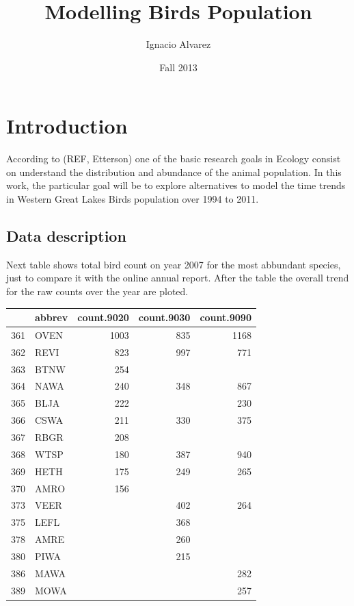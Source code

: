 \documentclass{article}\usepackage{graphicx, color}
\title{ Modelling Birds Population }
\author{Ignacio Alvarez}
\date{ Fall 2013 }
\begin{document}
\maketitle 

\section{Introduction} 
According to (REF, Etterson) one of the basic research goals in Ecology consist on understand the distribution and abundance of the animal population. In this work, the particular goal will be to explore alternatives to model the time trends in Western Great Lakes Birds population over 1994 to 2011. 

\vspace{2cm}

\subsection{Data description}

Next table shows total bird count on year 2007 for the most abbundant species, just to compare it with the online annual report. After the table the overall trend for the raw counts over the year are ploted. 

\begin{table}[ht]
\begin{center}
\begin{tabular}{rlrrr}
  \hline
 & abbrev & count.9020 & count.9030 & count.9090 \\ 
  \hline
361 & OVEN & 1003 & 835 & 1168 \\ 
  362 & REVI & 823 & 997 & 771 \\ 
  363 & BTNW & 254 &  &  \\ 
  364 & NAWA & 240 & 348 & 867 \\ 
  365 & BLJA & 222 &  & 230 \\ 
  366 & CSWA & 211 & 330 & 375 \\ 
  367 & RBGR & 208 &  &  \\ 
  368 & WTSP & 180 & 387 & 940 \\ 
  369 & HETH & 175 & 249 & 265 \\ 
  370 & AMRO & 156 &  &  \\ 
  373 & VEER &  & 402 & 264 \\ 
  375 & LEFL &  & 368 &  \\ 
  378 & AMRE &  & 260 &  \\ 
  380 & PIWA &  & 215 &  \\ 
  386 & MAWA &  &  & 282 \\ 
  389 & MOWA &  &  & 257 \\ 
   \hline
\end{tabular}
\end{center}
\end{table}
\end{document}
